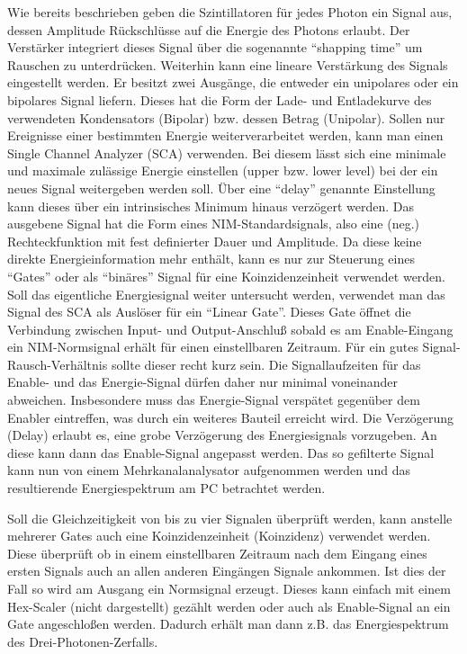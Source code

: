 Wie bereits beschrieben geben die Szintillatoren für jedes Photon ein Signal aus, dessen Amplitude Rückschlüsse auf die Energie des Photons erlaubt. Der Verstärker integriert dieses Signal über die sogenannte "`shapping time"' um Rauschen zu unterdrücken. Weiterhin kann eine lineare Verstärkung des Signals eingestellt werden. Er besitzt zwei Ausgänge, die entweder ein unipolares oder ein bipolares Signal liefern. Dieses hat die Form der Lade- und Entladekurve des verwendeten Kondensators (Bipolar) bzw. dessen Betrag (Unipolar). Sollen nur Ereignisse einer bestimmten Energie weiterverarbeitet werden, kann man einen Single Channel Analyzer (SCA) verwenden. Bei diesem lässt sich eine minimale und maximale zulässige Energie einstellen (upper bzw. lower level) bei der ein neues Signal weitergeben werden soll. Über eine "`delay"' genannte Einstellung kann dieses über ein intrinsisches Minimum hinaus verzögert werden. Das ausgebene Signal hat die Form eines NIM-Standardsignals, also eine (neg.) Rechteckfunktion mit fest definierter Dauer und Amplitude. Da diese keine direkte Energieinformation mehr enthält, kann es nur zur Steuerung eines "`Gates"' oder als "`binäres"' Signal für eine Koinzidenzeinheit verwendet werden. Soll das eigentliche Energiesignal weiter untersucht werden, verwendet man das Signal des SCA als Auslöser für ein "`Linear Gate"'. Dieses Gate öffnet die Verbindung zwischen Input- und Output-Anschluß sobald es am Enable-Eingang ein NIM-Normsignal erhält für einen einstellbaren Zeitraum. Für ein gutes Signal-Rausch-Verhältnis sollte dieser recht kurz sein. Die Signallaufzeiten für das Enable- und das Energie-Signal dürfen daher nur minimal voneinander abweichen. Insbesondere muss das Energie-Signal verspätet gegenüber dem Enabler eintreffen, was durch ein weiteres Bauteil erreicht wird. Die Verzögerung (Delay) erlaubt es, eine grobe Verzögerung des Energiesignals vorzugeben. An diese kann dann das Enable-Signal angepasst werden. Das so gefilterte Signal kann nun von einem Mehrkanalanalysator aufgenommen werden und das resultierende Energiespektrum am PC betrachtet werden.

Soll die Gleichzeitigkeit von bis zu vier Signalen überprüft werden, kann anstelle mehrerer Gates auch eine Koinzidenzeinheit (Koinzidenz) verwendet werden. Diese überprüft ob in einem einstellbaren Zeitraum nach dem Eingang eines ersten Signals auch an allen anderen Eingängen Signale ankommen. Ist dies der Fall so wird am Ausgang ein Normsignal erzeugt. Dieses kann einfach mit einem Hex-Scaler (nicht dargestellt) gezählt werden oder auch als Enable-Signal an ein Gate angeschloßen werden. Dadurch erhält man dann z.B. das Energiespektrum des Drei-Photonen-Zerfalls.
